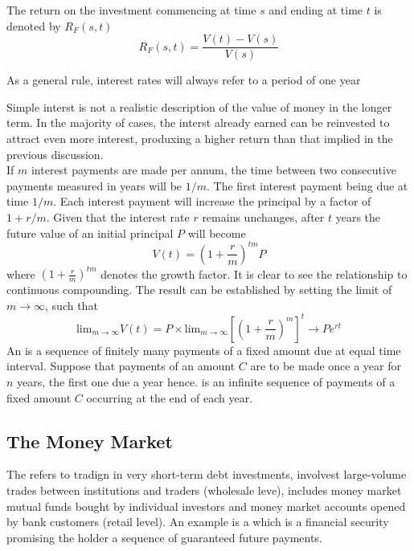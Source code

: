 \documentclass{article}
\begin{document}
The return on the investment commencing at time $s$ and ending at time $t$ is denoted by $R_F (s,t)$ $$R_F (s,t) = \frac{V(t) - V(s)}{V(s)}$$ 
\begin{remark}
  As a general rule, interest rates will always refer to a period of one year
\end{remark}

Simple interst is not a realistic description of the value of money in the longer term. In the majority of cases, the interst already earned can be reinvested to attract even more interest, produxing a higher return than that implied in the previous discussion. \\ 

If $m$ interest payments are made per annum, the time between two consecutive payments measured in years will be $1/m$. The first interest payment being due at time $1/m$. Each interest payment will increase the principal by a factor of $1 + r/m$. Given that the interest rate $r$ remains unchanges, after $t$ years the future value of an initial principal $P$ will become $$V(t) = (1 + \frac{r}{m})^{tm} P$$ where $(1 + \frac{r}{m})^{tm}$ denotes the growth factor. It is clear to see the relationship to continuous compounding. The result can be established by setting the limit of $m \rightarrow \infty$, such that $$\textrm{lim}_{m \rightarrow \infty}V(t) = P \times \textrm{lim}_{m \rightarrow \infty} [(1 + \frac{r}{m})^{m}]^{t} \rightarrow Pe^{rt}$$ An  is a sequence of finitely many payments of a fixed amount due at equal time interval. Suppose that payments of an amount $C$ are to be made once a year for $n$ years, the first one due a year hence.  is an infinite sequence of payments of a fixed amount $C$ occurring at the end of each year. 

\subsection{The Money Market}

The  refers to tradign in very short-term debt investments, involvest large-volume trades between institutions and traders (wholesale leve), includes money market mutual funds bought by individual investors and money market accounts opened by bank customers (retail level). An example is a  which is a financial security promising the holder a sequence of guaranteed future payments. \\ 
\end{document}
